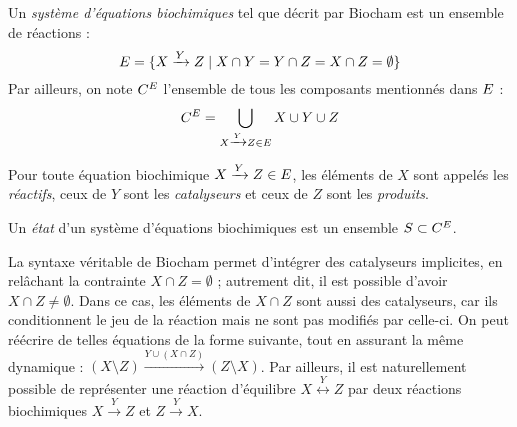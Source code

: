 
\begin{definition}
  Un \emph{système d'équations biochimiques} tel que décrit par Biocham
  est un ensemble de réactions :
  \[\BCe = \{ X \xrightarrow{Y} Z \mid X \cap Y = Y \cap Z = X \cap Z = \emptyset \}\]
  Par ailleurs, on note $\BCc[\BCe]$
  l'ensemble de tous les composants mentionnés dans $\BCe$ :
  \[\BCc = \bigcup_{X \xrightarrow{Y} Z \in \BCe} X \cup Y \cup Z\]
  
  Pour toute équation biochimique $X \xrightarrow{Y} Z \in \BCe$,
  les éléments de $X$ sont appelés les \emph{réactifs}, ceux de $Y$ sont les \emph{catalyseurs}
  et ceux de $Z$ sont les \emph{produits}.
  
  Un \emph{état} d'un système d'équations biochimiques est un ensemble $S \subset \BCc$.
\end{definition}

\begin{remark}
\label{bc-nondeterminisme}
  La syntaxe véritable de Biocham permet d'intégrer des catalyseurs implicites,
  en relâchant la contrainte $X \cap Z = \emptyset$ ;
  autrement dit, il est possible d'avoir $X \cap Z \neq \emptyset$.
  Dans ce cas, les éléments de $X \cap Z$ sont aussi des catalyseurs,
  car ils conditionnent le jeu de la réaction mais ne sont pas modifiés par celle-ci.
  On peut réécrire de telles équations de la forme suivante,
  tout en assurant la même dynamique :
  $(X \setminus Z) \xrightarrow{Y \cup (X \cap Z)} (Z \setminus X)$.
  Par ailleurs, il est naturellement possible de représenter une réaction d'équilibre
  $X \overset{Y}{\longleftrightarrow} Z$ par deux réactions biochimiques
  $X \xrightarrow{Y} Z$ et $Z \xrightarrow{Y} X$.
\end{remark}

